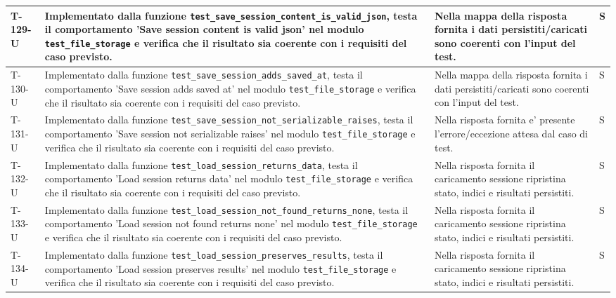 \documentclass[a4paper,12pt]{article}
\begin{document}
{{\begin{longtable}{|>{\RaggedRight\arraybackslash}p{1.55cm}|>{\RaggedRight\arraybackslash}p{8.0cm}|>{\RaggedRight\arraybackslash}p{4.6cm}|>{\RaggedRight\arraybackslash}p{1.2cm}|}
        \hline
        T-129-U & Implementato dalla funzione \texttt{test\_\allowbreak save\_\allowbreak session\_\allowbreak content\_\allowbreak is\_\allowbreak valid\_\allowbreak json}, testa il comportamento 'Save session content is valid json' nel modulo \texttt{test\_\allowbreak file\_\allowbreak storage} e verifica che il risultato sia coerente con i requisiti del caso previsto. & Nella mappa della risposta fornita i dati persistiti/caricati sono coerenti con l'input del test. & S \\
        \hline
        T-130-U & Implementato dalla funzione \texttt{test\_\allowbreak save\_\allowbreak session\_\allowbreak adds\_\allowbreak saved\_\allowbreak at}, testa il comportamento 'Save session adds saved at' nel modulo \texttt{test\_\allowbreak file\_\allowbreak storage} e verifica che il risultato sia coerente con i requisiti del caso previsto. & Nella mappa della risposta fornita i dati persistiti/caricati sono coerenti con l'input del test. & S \\
        \hline
        T-131-U & Implementato dalla funzione \texttt{test\_\allowbreak save\_\allowbreak session\_\allowbreak not\_\allowbreak serializable\_\allowbreak raises}, testa il comportamento 'Save session not serializable raises' nel modulo \texttt{test\_\allowbreak file\_\allowbreak storage} e verifica che il risultato sia coerente con i requisiti del caso previsto. & Nella risposta fornita e' presente l'errore/eccezione attesa dal caso di test. & S \\
        \hline
        T-132-U & Implementato dalla funzione \texttt{test\_\allowbreak load\_\allowbreak session\_\allowbreak returns\_\allowbreak data}, testa il comportamento 'Load session returns data' nel modulo \texttt{test\_\allowbreak file\_\allowbreak storage} e verifica che il risultato sia coerente con i requisiti del caso previsto. & Nella risposta fornita il caricamento sessione ripristina stato, indici e risultati persistiti. & S \\
        \hline
        T-133-U & Implementato dalla funzione \texttt{test\_\allowbreak load\_\allowbreak session\_\allowbreak not\_\allowbreak found\_\allowbreak returns\_\allowbreak none}, testa il comportamento 'Load session not found returns none' nel modulo \texttt{test\_\allowbreak file\_\allowbreak storage} e verifica che il risultato sia coerente con i requisiti del caso previsto. & Nella risposta fornita il caricamento sessione ripristina stato, indici e risultati persistiti. & S \\
        \hline
        T-134-U & Implementato dalla funzione \texttt{test\_\allowbreak load\_\allowbreak session\_\allowbreak preserves\_\allowbreak results}, testa il comportamento 'Load session preserves results' nel modulo \texttt{test\_\allowbreak file\_\allowbreak storage} e verifica che il risultato sia coerente con i requisiti del caso previsto. & Nella risposta fornita il caricamento sessione ripristina stato, indici e risultati persistiti. & S \\

\end{longtable}}}
\end{document}
